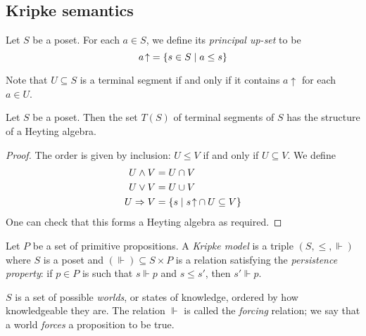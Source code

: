 \subsection{Kripke semantics}
\begin{definition}
    Let \( S \) be a poset.
    For each \( a \in S \), we define its \emph{principal up-set} to be
    \[ {a\!\uparrow} = \qty{s \in S \mid a \leq s} \]
\end{definition}
Note that \( U \subseteq S \) is a terminal segment if and only if it contains \( a\!\uparrow \) for each \( a \in U \).
\begin{proposition}
    Let \( S \) be a poset.
    Then the set \( T(S) \) of terminal segments of \( S \) has the structure of a Heyting algebra.
\end{proposition}
\begin{proof}
    The order is given by inclusion: \( U \leq V \) if and only if \( U \subseteq V \).
    We define
    \begin{align*}
        U \wedge V &= U \cap V \\
        U \vee V &= U \cup V \\
        U \Rightarrow V &= \qty{s \mid {s\!\uparrow} \cap U \subseteq V}
    \end{align*}
    One can check that this forms a Heyting algebra as required.
\end{proof}
\begin{definition}
    Let \( P \) be a set of primitive propositions.
    A \emph{Kripke model} is a triple \( (S, \leq, \Vdash) \) where \( S \) is a poset and \( (\Vdash) \subseteq S \times P \) is a relation satisfying the \emph{persistence property}: if \( p \in P \) is such that \( s \Vdash p \) and \( s \leq s' \), then \( s' \Vdash p \).
\end{definition}
\( S \) is a set of possible \emph{worlds}, or states of knowledge, ordered by how knowledgeable they are.
The relation \( \Vdash \) is called the \emph{forcing} relation; we say that a world \emph{forces} a proposition to be true.

